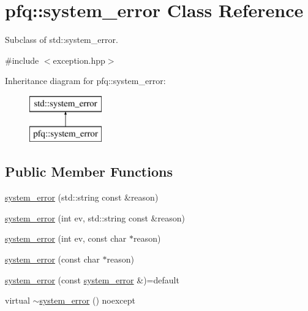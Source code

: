 \hypertarget{classpfq_1_1system__error}{}\section{pfq\+:\+:system\+\_\+error Class Reference}
\label{classpfq_1_1system__error}


Subclass of std\+::system\+\_\+error.  




{\ttfamily \#include $<$exception.\+hpp$>$}

Inheritance diagram for pfq\+:\+:system\+\_\+error\+:\begin{figure}[H]
\begin{center}
\leavevmode
\includegraphics[height=2.000000cm]{classpfq_1_1system__error}
\end{center}
\end{figure}
\subsection*{Public Member Functions}
\begin{DoxyCompactItemize}
\item 
\hyperlink{classpfq_1_1system__error_ab7d95c442ad80d82ad0833c446b592fb}{system\+\_\+error} (std\+::string const \&reason)
\item 
\hyperlink{classpfq_1_1system__error_ac58f673c8a80a307d73dbd6fc8c929e9}{system\+\_\+error} (int ev, std\+::string const \&reason)
\item 
\hyperlink{classpfq_1_1system__error_a3e910685d60b7a835cc4e82dfd2e2ad7}{system\+\_\+error} (int ev, const char $\ast$reason)
\item 
\hyperlink{classpfq_1_1system__error_af9a6e0675cc2e0c9aa4e4d275f236490}{system\+\_\+error} (const char $\ast$reason)
\item 
\hyperlink{classpfq_1_1system__error_ac1014c630852b03c9a0458cc8af509eb}{system\+\_\+error} (const \hyperlink{classpfq_1_1system__error}{system\+\_\+error} \&)=default
\item 
virtual \hyperlink{classpfq_1_1system__error_aba87ae84b44c7dda02cabbc85192ab47}{$\sim$system\+\_\+error} () noexcept
\end{DoxyCompactItemize}


